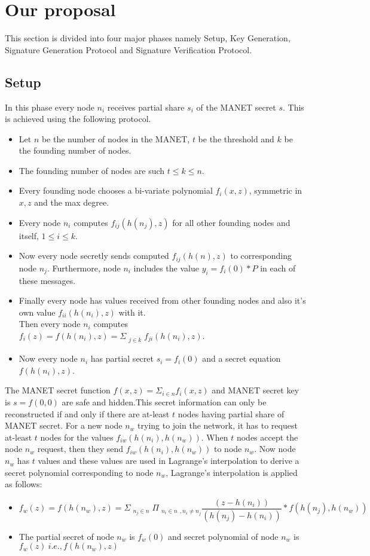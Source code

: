\documentclass[11pt,a4paper]{llncs}
\begin{document}
\section{Our proposal}
This section is divided into four major phases namely Setup, Key Generation, Signature Generation Protocol and Signature Verification Protocol.

\subsection{Setup}

In this phase every node $n_i$ receives partial share $s_i$ of the MANET secret $s$. This is achieved using the following protocol.
\begin{itemize}
\item Let $n$ be the number of nodes in the MANET, $t$ be the threshold and $k$ be the founding number of nodes.
\item The founding number of nodes are such $t\leq k \leq n$.
\item Every founding node chooses a bi-variate polynomial $f_i(x,z)$, symmetric in $x,z$ and the max degree.
\item Every node $n_i$ computes $f_{ij}(h(n_j),z)$ for all other founding nodes and itself, $1\leq i\leq k.$
\item Now every node secretly sends computed $f_{ij}(h(n),z)$ to corresponding node $n_j$. Furthermore, node $n_i$ includes the value $y_i = f_i(0 )*P$ in each of these messages.
\item Finally every node has values received from other founding nodes and also it's own value $f_{ii}(h(n_i),z)$ with it. 
\\ Then every node $n_i$ computes  $f_i(z)=f(h(n_i),z)=\Sigma_{\substack{j \in k}}f_{ji}(h(n_i),z)$.
\item Now every node $n_i$ has partial secret $s_i=f_i(0)$ and a secret equation  $f(h(n_i),z)$.
\end{itemize}

The MANET secret function $f(x,z)=\Sigma_{i \in n}f_i(x,z)$ and MANET secret key is $s=f(0,0)$ are safe and hidden.This secret information can only be reconstructed if and only if there are at-least $t$ nodes having partial share of MANET secret. For a new node $n_w$ trying to join the network, it has to request at-least $t$ nodes for the values $f_{iw}(h(n_i),h(n_w))$. When $t$ nodes accept the node $n_w$ request, then they send $f_{iw}(h(n_i),h(n_w))$ to node $n_w$. Now node $n_w$ has $t$ values and these values are used in Lagrange's interpolation to derive a secret polynomial corresponding to node $n_w$, Lagrange's interpolation is applied as follows:
\begin{itemize}
\item  $$f_w(z)=f(h(n_w),z)=
\Sigma_{\substack{n_j \in n}}\Pi_{\substack{n_i \in n},n_i \neq n_j}\frac{(z-h(n_i))}{(h(n_j)-h(n_i))}*f(h(n_j),h(n_w))$$
\item The partial secret of node $n_w$ is $f_w(0)$ and secret polynomial of node $n_w$ is $f_w(z)\ i.e., f(h(n_w),z)$
\end{itemize}
\end{document}
